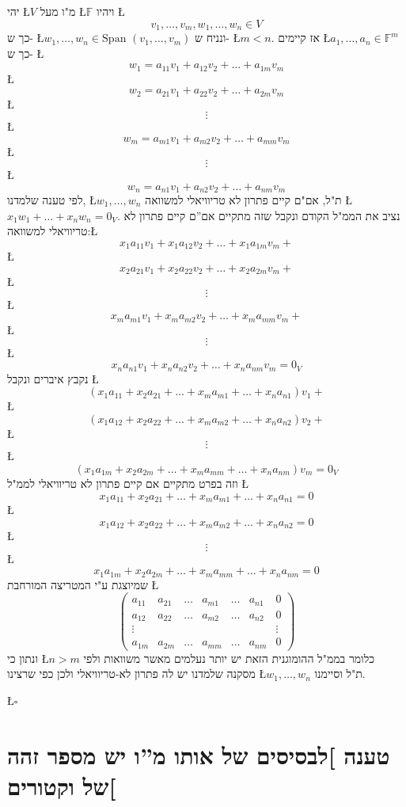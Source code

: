 \documentclass[english,hebrew]{article}
\newcommand{\spn}{\text{Span }}
\begin{document}
יהי \L{$V$} מ"ו מעל \L{$\mathbb{F}$} ויהיו \L{%
\[
v_{1},\dots,v_{m},w_{1},\dots,w_{n}\in V
\]
}%
כך ש- \L{$w_{1},\dots,w_{n}\in\spn(v_{1},\dots,v_{m})$} ונניח ש-
\L{$m<n$}. אז קיימים \L{$a_{1},\dots,a_{n}\in\mathbb{F}^{m}$} כך
ש- \L{%
\[
w_{1}=a_{11}v_{1}+a_{12}v_{2}+\dots+a_{1m}v_{m}
\]
}%
\L{%
\[
w_{2}=a_{21}v_{1}+a_{22}v_{2}+\dots+a_{2m}v_{m}
\]
}%
\L{%
\[
\vdots
\]
}%
\L{%
\[
w_{m}=a_{m1}v_{1}+a_{m2}v_{2}+\dots+a_{mm}v_{m}
\]
}%
\L{%
\[
\vdots
\]
}%
\L{%
\[
w_{n}=a_{n1}v_{1}+a_{n2}v_{2}+\dots+a_{nm}v_{m}
\]
}%
לפי טענה שלמדנו, \L{$w_{1},\dots,w_{n}$} ת"ל, אם"ם קיים פתרון לא
טריוויאלי למשוואה \L{$x_{1}w_{1}+\dots+x_{n}w_{n}=0_{V}$}. נציב את
הממ"ל הקודם ונקבל שזה מתקיים אם\textquotedblright ם קיים פתרון לא
טריוויאלי למשוואה:\L{%
\[
x_{1}a_{11}v_{1}+x_{1}a_{12}v_{2}+\dots+x_{1}a_{1m}v_{m}+
\]
}%
\L{%
\[
x_{2}a_{21}v_{1}+x_{2}a_{22}v_{2}+\dots+x_{2}a_{2m}v_{m}+
\]
}%
\L{%
\[
\vdots
\]
}%
\L{%
\[
x_{m}a_{m1}v_{1}+x_{m}a_{m2}v_{2}+\dots+x_{m}a_{mm}v_{m}+
\]
}%
\L{%
\[
\vdots
\]
}%
\L{%
\[
x_{n}a_{n1}v_{1}+x_{n}a_{n2}v_{2}+\dots+x_{n}a_{nm}v_{m}=0_{V}
\]
}%
נקבץ איברים ונקבל \L{%
\[
(x_{1}a_{11}+x_{2}a_{21}+\dots+x_{m}a_{m1}+\dots+x_{n}a_{n1})v_{1}+
\]
}%
\L{%
\[
(x_{1}a_{12}+x_{2}a_{22}+\dots+x_{m}a_{m2}+\dots+x_{n}a_{n2})v_{2}+
\]
}%
\L{%
\[
\vdots
\]
}%
\L{%
\[
(x_{1}a_{1m}+x_{2}a_{2m}+\dots+x_{m}a_{mm}+\dots+x_{n}a_{nm})v_{m}=0_{V}
\]
}%
וזה בפרט מתקיים אם קיים פתרון לא טריוויאלי לממ"ל \L{%
\[
x_{1}a_{11}+x_{2}a_{21}+\dots+x_{m}a_{m1}+\dots+x_{n}a_{n1}=0
\]
}%
\L{%
\[
x_{1}a_{12}+x_{2}a_{22}+\dots+x_{m}a_{m2}+\dots+x_{n}a_{n2}=0
\]
}%
\L{%
\[
\vdots
\]
}%
\L{%
\[
x_{1}a_{1m}+x_{2}a_{2m}+\dots+x_{m}a_{mm}+\dots+x_{n}a_{nm}=0
\]
}%
שמיוצגת ע"י המטריצה המורחבת \L{%
\[
\left(\begin{array}{cccccc|c}
a_{11} & a_{21} & \dots & a_{m1} & \dots & a_{n1} & 0\\
a_{12} & a_{22} & \dots & a_{m2} & \dots & a_{n2} & 0\\
\vdots &  &  &  &  &  & \vdots\\
a_{1m} & a_{2m} & \dots & a_{mm} & \dots & a_{nm} & 0
\end{array}\right)
\]
}%
ונתון כי \L{$n>m$} כלומר בממ"ל ההומוגנית הזאת יש יותר נעלמים מאשר
משוואות ולפי מסקנה שלמדנו יש לה פתרון לא-טריוויאלי ולכן כפי שרצינו
\L{$w_{1},\dots,w_{n}$} ת"ל וסיימנו. 
\begin{flushright}
\L{$\square$}
\par\end{flushright}

\section{טענה {]}לבסיסים של אותו מ\textquotedblright ו יש מספר זהה של וקטורים{[}}
\end{document}

